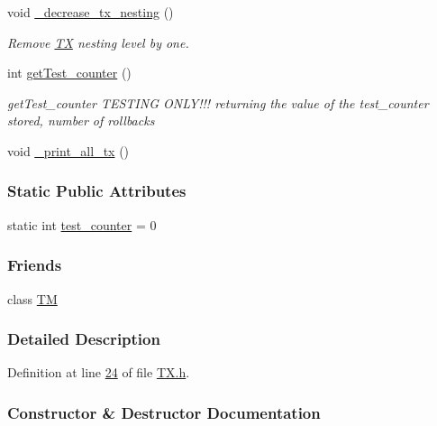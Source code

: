 \begin{DoxyCompactItemize}
void \hyperlink{class_t_x_aa3ac499f576326588628ade96b27b4b1}{\+\_\+decrease\+\_\+tx\+\_\+nesting} ()
\begin{DoxyCompactList}\small\item\em Remove \hyperlink{class_t_x}{TX} nesting level by one. \end{DoxyCompactList}\item 
int \hyperlink{class_t_x_ae9bf97930c4670f59d334b345353a71e}{get\+Test\+\_\+counter} ()\hypertarget{class_t_x_ae9bf97930c4670f59d334b345353a71e}{}\label{class_t_x_ae9bf97930c4670f59d334b345353a71e}

\begin{DoxyCompactList}\small\item\em get\+Test\+\_\+counter T\+E\+S\+T\+I\+NG O\+N\+L\+Y!!! returning the value of the test\+\_\+counter stored, number of rollbacks \end{DoxyCompactList}\item 
void \hyperlink{class_t_x_a3d96ed91eb9ec73e16589f705661c5a7}{\+\_\+print\+\_\+all\+\_\+tx} ()
\end{DoxyCompactItemize}
\subsubsection*{Static Public Attributes}
\begin{DoxyCompactItemize}
\item 
static int \hyperlink{class_t_x_a25838234aab99ae891a90eb8623a8b3c}{test\+\_\+counter} = 0
\end{DoxyCompactItemize}
\subsubsection*{Friends}
\begin{DoxyCompactItemize}
\item 
class \hyperlink{class_t_x_adf1ccda799ef5c419cb43b8ae55eb45c}{TM}
\end{DoxyCompactItemize}


\subsubsection{Detailed Description}


Definition at line \hyperlink{_t_x_8h_source_l00024}{24} of file \hyperlink{_t_x_8h_source}{T\+X.\+h}.



\subsubsection{Constructor \& Destructor Documentation}
